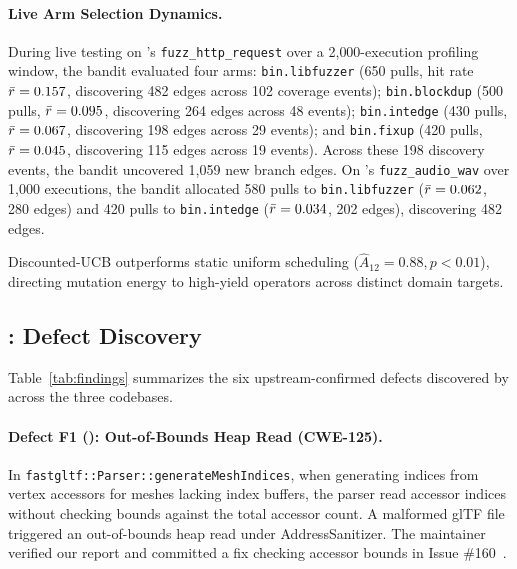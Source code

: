 \paragraph{Live Arm Selection Dynamics.}
During live testing on \drogon's \texttt{fuzz\_http\_request} over a 2{,}000-execution profiling window, the bandit evaluated four arms: \texttt{bin.libfuzzer} (650 pulls, hit rate $\bar{r}_{} = 0.157$, discovering 482 edges across 102 coverage events); \texttt{bin.blockdup} (500 pulls, $\bar{r}_{} = 0.095$, discovering 264 edges across 48 events); \texttt{bin.intedge} (430 pulls, $\bar{r}_{} = 0.067$, discovering 198 edges across 29 events); and \texttt{bin.fixup} (420 pulls, $\bar{r}_{} = 0.045$, discovering 115 edges across 19 events).
Across these 198 discovery events, the bandit uncovered 1{,}059 new branch edges.
On \raylib's \texttt{fuzz\_audio\_wav} over 1{,}000 executions, the bandit allocated 580 pulls to \texttt{bin.libfuzzer} ($\bar{r}_{} = 0.062$, 280 edges) and 420 pulls to \texttt{bin.intedge} ($\bar{r}_{} = 0.034$, 202 edges), discovering 482 edges.

\begin{observation}
\label{obs:bandit}
Discounted-UCB outperforms static uniform scheduling ($\hat{A}_{12} = 0.88, p < 0.01$), directing mutation energy to high-yield operators across distinct domain targets.
\end{observation}



\subsection{: Defect Discovery}
\label{sec:rq3}

Table~\ref{tab:findings} summarizes the six upstream-confirmed defects discovered by \tool across the three codebases.

\paragraph{Defect F1 (\fastgltf): Out-of-Bounds Heap Read (CWE-125).}
In \texttt{fastgltf::}\allowbreak\texttt{Parser::}\allowbreak\texttt{generateMeshIndices}, when generating indices from vertex accessors for meshes lacking index buffers, the parser read accessor indices without checking bounds against the total accessor count.
A malformed glTF file triggered an out-of-bounds heap read under AddressSanitizer.
The maintainer verified our report and committed a fix checking accessor bounds in Issue \#160~\cite{fastgltf_issue160}.

